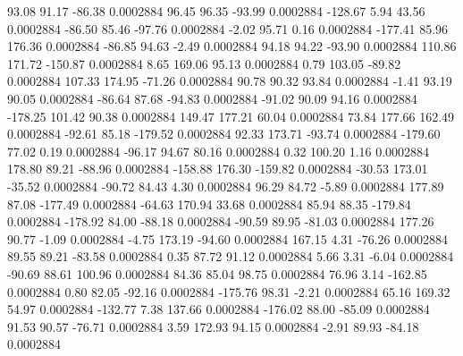        93.08       91.17      -86.38     0.0002884
       96.45       96.35      -93.99     0.0002884
     -128.67        5.94       43.56     0.0002884
      -86.50       85.46      -97.76     0.0002884
       -2.02       95.71        0.16     0.0002884
     -177.41       85.96      176.36     0.0002884
      -86.85       94.63       -2.49     0.0002884
       94.18       94.22      -93.90     0.0002884
      110.86      171.72     -150.87     0.0002884
        8.65      169.06       95.13     0.0002884
        0.79      103.05      -89.82     0.0002884
      107.33      174.95      -71.26     0.0002884
       90.78       90.32       93.84     0.0002884
       -1.41       93.19       90.05     0.0002884
      -86.64       87.68      -94.83     0.0002884
      -91.02       90.09       94.16     0.0002884
     -178.25      101.42       90.38     0.0002884
      149.47      177.21       60.04     0.0002884
       73.84      177.66      162.49     0.0002884
      -92.61       85.18     -179.52     0.0002884
       92.33      173.71      -93.74     0.0002884
     -179.60       77.02        0.19     0.0002884
      -96.17       94.67       80.16     0.0002884
        0.32      100.20        1.16     0.0002884
      178.80       89.21      -88.96     0.0002884
     -158.88      176.30     -159.82     0.0002884
      -30.53      173.01      -35.52     0.0002884
      -90.72       84.43        4.30     0.0002884
       96.29       84.72       -5.89     0.0002884
      177.89       87.08     -177.49     0.0002884
      -64.63      170.94       33.68     0.0002884
       85.94       88.35     -179.84     0.0002884
     -178.92       84.00      -88.18     0.0002884
      -90.59       89.95      -81.03     0.0002884
      177.26       90.77       -1.09     0.0002884
       -4.75      173.19      -94.60     0.0002884
      167.15        4.31      -76.26     0.0002884
       89.55       89.21      -83.58     0.0002884
        0.35       87.72       91.12     0.0002884
        5.66        3.31       -6.04     0.0002884
      -90.69       88.61      100.96     0.0002884
       84.36       85.04       98.75     0.0002884
       76.96        3.14     -162.85     0.0002884
        0.80       82.05      -92.16     0.0002884
     -175.76       98.31       -2.21     0.0002884
       65.16      169.32       54.97     0.0002884
     -132.77        7.38      137.66     0.0002884
     -176.02       88.00      -85.09     0.0002884
       91.53       90.57      -76.71     0.0002884
        3.59      172.93       94.15     0.0002884
       -2.91       89.93      -84.18     0.0002884
